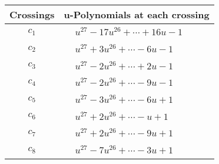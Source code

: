 \documentclass[1p]{elsarticle_modified}
\theoremstyle{definition}
\begin{document}
\begin{tabular}{m{50pt}|m{274pt}}
Crossings & \hspace{64pt}u-Polynomials at each crossing \\
\hline $$\begin{aligned}c_{1}\end{aligned}$$&$\begin{aligned}
&u^{27}-17 u^{26}+\cdots+16 u-1
\end{aligned}$\\
\hline $$\begin{aligned}c_{2}\end{aligned}$$&$\begin{aligned}
&u^{27}+3 u^{26}+\cdots-6 u-1
\end{aligned}$\\
\hline $$\begin{aligned}c_{3}\end{aligned}$$&$\begin{aligned}
&u^{27}-2 u^{26}+\cdots+2 u-1
\end{aligned}$\\
\hline $$\begin{aligned}c_{4}\end{aligned}$$&$\begin{aligned}
&u^{27}-2 u^{26}+\cdots-9 u-1
\end{aligned}$\\
\hline $$\begin{aligned}c_{5}\end{aligned}$$&$\begin{aligned}
&u^{27}-3 u^{26}+\cdots-6 u+1
\end{aligned}$\\
\hline $$\begin{aligned}c_{6}\end{aligned}$$&$\begin{aligned}
&u^{27}+2 u^{26}+\cdots- u+1
\end{aligned}$\\
\hline $$\begin{aligned}c_{7}\end{aligned}$$&$\begin{aligned}
&u^{27}+2 u^{26}+\cdots-9 u+1
\end{aligned}$\\
\hline $$\begin{aligned}c_{8}\end{aligned}$$&$\begin{aligned}
&u^{27}-7 u^{26}+\cdots-3 u+1
\end{aligned}$\\

\end{tabular}
\end{document}
